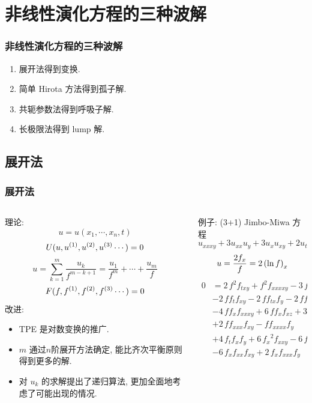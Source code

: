 \section{非线性演化方程的三种波解}
\begin{frame}
\frametitle{非线性演化方程的三种波解}
\begin{enumerate}
\item \Painleve{}展开法得到变换.
\item 简单 Hirota 方法得到孤子解.
\item 共轭参数法得到呼吸子解.
\item 长极限法得到 lump 解.
\end{enumerate}
\end{frame}

\subsection{\Painleve{}展开法}
\begin{frame}
\frametitle{\Painleve{}展开法}
\begin{columns}
\small 
\begin{column}{0.5\textwidth}
理论:
\[
    u=u(x_1,\cdots,x_n,t)
\]
\[
    U(u,u^{(1)},u^{(2)},u^{(3)}\cdots)=0
\]
\[
    u=\sum_{k=1}^m{\frac{u_k}{f^{m-k+1}}}=\frac{u_1}{f^m}+\cdots+\frac{u_m}{f}
\]
\[
    F(f,f^{(1)},f^{(2)},f^{(3)}\cdots)=0
\]
改进:
\begin{itemize}
\item TPE 是对数变换的推广.
\item $m$ 通过$n$阶展开方法确定, 能比齐次平衡原则得到更多的解.
\item 对 $u_k$ 的求解提出了递归算法, 更加全面地考虑了可能出现的情况.
\end{itemize}
\end{column}
\begin{column}{0.5\textwidth}
例子: (3+1) Jimbo-Miwa 方程
\[
    u_{xxxy}+3u_{xx}u_y+3u_{x}u_{xy}+2u_{ty}-3u_{xz}=0
\]
\[
    u=\frac{2f_x}{f}=2\left(\ln f\right)_x
\]
\[
\begin{aligned}
    0&=2\,{f}^{2}f_{{{ txy}}}+{f}^{2}f_{{{ xxxxy}}}-3\,{f}^{2}f_{{{ xxz}}}\\
    &-2\,ff_{{t}}f_{{{ xy}}}-2\,ff_{{{ tx}}}f_{{y}}-2\,ff_{{{ ty}}}f_{{x}}\\
    &-4\,ff_{{x}}f_{{{ xxxy}}}+6\,ff_{{x}}f_{{{ xz}}}+3\,ff_{{{ xx}}}f_{{z}}\\
    &+2\,ff_{{{ xxx}}}f_{{{xy}}}-ff_{{{ xxxx}}}f_{{y}}\\
    &+4\,f_{{t}}f_{{x}}f_{{y}}+6\,{f_{{x}}}^{2}f_{{{ xxy}}}-6\,{f_{{x}}}^{2}f_{{z}}\\
    &-6\,f_{{x}}f_{{{ xx}}}f_{{{ xy}}}+2\,f_{{x}}f_{{{ xxx}}}f_{{y}}
\end{aligned}
\]
\end{column}
\end{columns}
\end{frame}

